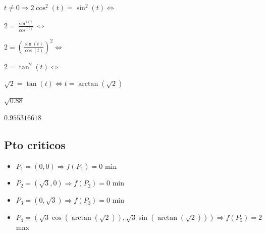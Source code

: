 \documentclass[../practica_06.tex]{subfiles}
\begin{document}
\begin{enumerate}
                $ t \neq 0 \Rightarrow 2\cos^2(t) = \sin^2(t) \Leftrightarrow $

                $ 2 = \frac{\sin^(t)}{\cos^(t)} \Leftrightarrow $

                $ 2 = (\frac{\sin(t)}{\cos(t)})^2 \Leftrightarrow $

                $ 2 = \tan^2(t) \Leftrightarrow $

                $ \sqrt{2} = \tan(t) \Leftrightarrow t = \arctan(\sqrt{2})$

                $\sqrt{0.88}$

                $ 0.955316618 $

            \subsection*{Pto criticos}

                \begin{itemize}
                    \item $P_1 = (0,0) \Rightarrow f(P_1) = 0 $ min
                    \item $P_2 = (\sqrt{3},0)\Rightarrow f(P_2) =0 $ min
                    \item $P_3 = (0,\sqrt{3})\Rightarrow f(P_3) =0 $ min
                    \item $P_4 = (\sqrt{3}\cos(\arctan(\sqrt{2})), \sqrt{3}\sin(\arctan(\sqrt{2})))\Rightarrow f(P_5) = 2$ max
                \end{itemize}

    \end{enumerate}
\end{document}
